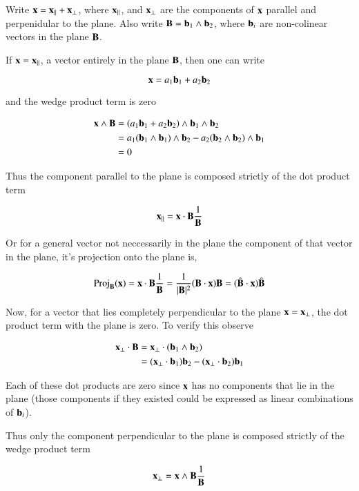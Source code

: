 \documentclass{article}      %
\begin{document}
Write $\mathbf{x} = \mathbf{x}_\parallel + \mathbf{x}_\perp$, where $\mathbf{x}_\parallel$, and $\mathbf{x}_\perp$ are the components of $\mathbf{x}$ parallel and perpenidular to the plane.  Also write
$\mathbf{B} = \mathbf{b}_1 \wedge \mathbf{b}_2$, where $\mathbf{b}_i$ are non-colinear vectors in the plane $\mathbf{B}$.

If $\mathbf{x} = \mathbf{x}_\parallel$, a vector entirely in the plane $\mathbf{B}$, then one can
write

\[
\mathbf{x} = a_1\mathbf{b}_1 + a_2\mathbf{b}_2
\]

and the wedge product term is zero

\begin{align*}
\mathbf{x} \wedge \mathbf{B} 
&= \left( a_1\mathbf{b}_1 + a_2\mathbf{b}_2 \right) \wedge \mathbf{b}_1 \wedge \mathbf{b}_2 \\
&= a_1 ( \mathbf{b}_1 \wedge \mathbf{b}_1 ) \wedge \mathbf{b}_2
 - a_2 ( \mathbf{b}_2 \wedge \mathbf{b}_2 ) \wedge \mathbf{b}_1 \\
&= 0
\end{align*}

Thus the component parallel to the plane is composed strictly of the dot
product term

\begin{equation}
\mathbf{x}_\parallel = \mathbf{x} \cdot \mathbf{B} \frac{1}{\mathbf{B}}
\end{equation}

Or for a general vector not neccessarily in the plane the component
of that vector in the plane, it's projection onto the plane is,

\[
\operatorname{Proj}_{\mathbf{B}}(\mathbf{x}) = \mathbf{x} \cdot \mathbf{B} \frac{1}{\mathbf{B}}
= \frac{1}{\lvert{\mathbf{B}}\rvert^2}(\mathbf{B} \cdot \mathbf{x})\mathbf{B}
= (\hat{\mathbf{B}} \cdot \mathbf{x})\hat{\mathbf{B}}
\]

Now, for a vector that lies completely perpendicular to the plane $\mathbf{x} = \mathbf{x}_\perp$, the dot product term with the plane is zero.  To verify this observe

\begin{align*}
\mathbf{x}_\perp \cdot \mathbf{B} 
&= \mathbf{x}_\perp \cdot (\mathbf{b}_1 \wedge \mathbf{b}_2) \\
&= (\mathbf{x}_\perp \cdot \mathbf{b}_1) \mathbf{b}_2 - (\mathbf{x}_\perp \cdot \mathbf{b}_2) \mathbf{b}_1 \\
\end{align*}

Each of these dot products are zero since $\mathbf{x}$ has no components that lie
in the plane (those components if they existed could be expressed as linear
combinations of $\mathbf{b}_i$).

Thus only the component perpendicular to the plane is composed strictly of the 
wedge product term

\begin{equation}
\mathbf{x}_\perp = \mathbf{x} \wedge \mathbf{B} \frac{1}{\mathbf{B}}
\end{equation}
\end{document}
